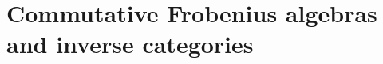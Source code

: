\chapter{Commutative Frobenius algebras and inverse categories} %
\label{chap:commutative_frobenius_algebras}







